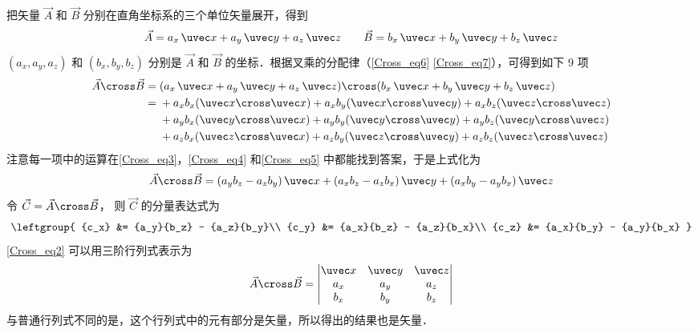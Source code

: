 把矢量 $\vec A$ 和 $\vec B$ 分别在直角坐标系的三个单位矢量展开，得到
\begin{equation}
\vec A = a_x\,\uvec x + a_y\,\uvec y + a_z\,\uvec z \qquad \vec B = b_x\,\uvec x + b_y\,\uvec y + b_z\,\uvec z
\end{equation}
$(a_x,a_y,a_z)$ 和 $(b_x,b_y,b_z)$ 分别是 $\vec A$ 和 $\vec B$ 的坐标．根据叉乘的分配律（\autoref{Cross_eq6} \autoref{Cross_eq7}），可得到如下 9 项
\begin{equation}
\begin{aligned}
\vec A \cross \vec B ={} &(a_x\,\uvec x + a_y\,\uvec y + a_z\,\uvec z) \cross (b_x\,\uvec x + b_y\,\uvec y + b_z\,\uvec z)\\
={} &+ {a_x}{b_x}(\uvec x \cross \uvec x) + {a_x}{b_y}(\uvec x \cross \uvec y) + {a_x}{b_z}(\uvec z \cross \uvec z)\\
&+ {a_y}{b_x}(\uvec y \cross \uvec x) + {a_y}{b_y}(\uvec y \cross \uvec y) + {a_y}{b_z}(\uvec y \cross \uvec z)\\
&+ {a_z}{b_x}(\uvec z \cross \uvec x) + {a_z}{b_y}(\uvec z \cross \uvec y) + {a_z}{b_z}(\uvec z \cross \uvec z)
\end{aligned}
\end{equation}
注意每一项中的运算在\autoref{Cross_eq3}，\autoref{Cross_eq4} 和\autoref{Cross_eq5} 中都能找到答案，于是上式化为
\begin{equation}\label{Cross_eq2}
\vec A \cross \vec B = (a_y b_z - a_z b_y)\,\uvec x + (a_x b_z - a_z b_x)\,\uvec y + (a_x b_y - a_y b_x)\,\uvec z
\end{equation}
令 $\vec C = \vec A \cross \vec B$， 则 $\vec C$ 的分量表达式为
\begin{equation}
\leftgroup{
{c_x} &= {a_y}{b_z} - {a_z}{b_y}\\
{c_y} &= {a_x}{b_z} - {a_z}{b_x}\\
{c_z} &= {a_x}{b_y} - {a_y}{b_x}
}\end{equation}
\autoref{Cross_eq2} 可以用三阶行列式表示为
\begin{equation}
\vec A \cross \vec B = 
\begin{vmatrix}
{\uvec x} & {\uvec y} &{ \uvec z}\\
{a_x} & {a_y} & {a_z}\\
{b_x} & {b_y} & {b_z}
\end{vmatrix} \end{equation}
与普通行列式不同的是，这个行列式中的元有部分是矢量，所以得出的结果也是矢量．

